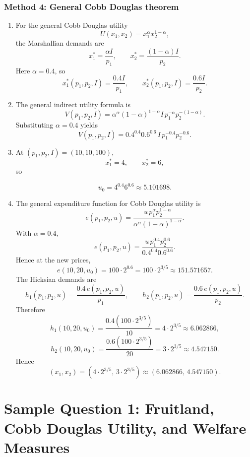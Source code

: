 \documentclass[12pt]{article}
\begin{document}
\newpage
\subsubsection{Method 4: General Cobb Douglas theorem}
\begin{enumerate}[label=(\alph*)]
    \item
    For the general Cobb Douglas utility
    \[
    U(x_1,x_2)=x_1^\alpha x_2^{1-\alpha},
    \]
    the Marshallian demands are
    \[
    x_1^*=\frac{\alpha I}{p_1},
    \qquad
    x_2^*=\frac{(1-\alpha)I}{p_2}.
    \]
    Here \(\alpha=0.4\), so
    \[
    \boxed{
    x_1^*(p_1,p_2,I)=\frac{0.4I}{p_1},
    \qquad
    x_2^*(p_1,p_2,I)=\frac{0.6I}{p_2}.
    }
    \]

    \item
    The general indirect utility formula is
    \[
    V(p_1,p_2,I)=\alpha^\alpha(1-\alpha)^{1-\alpha}I\,p_1^{-\alpha}p_2^{-(1-\alpha)}.
    \]
    Substituting \(\alpha=0.4\) yields
    \[
    \boxed{
    V(p_1,p_2,I)=0.4^{0.4}0.6^{0.6}\,I\,p_1^{-0.4}p_2^{-0.6}.
    }
    \]

    \item
    At \((p_1,p_2,I)=(10,10,100)\),
    \[
    x_1^*=4,\qquad x_2^*=6,
    \]
    so

    \[
    \boxed{u_0=4^{0.4}6^{0.6}\approx 5.101698.}
    \]

    \item
    The general expenditure function for Cobb Douglas utility is
    \[
    e(p_1,p_2,u)=\frac{u\,p_1^\alpha p_2^{1-\alpha}}{\alpha^\alpha(1-\alpha)^{1-\alpha}}.
    \]
    With \(\alpha=0.4\),
    \[
    e(p_1,p_2,u)=\frac{u\,p_1^{0.4}p_2^{0.6}}{0.4^{0.4}0.6^{0.6}}.
    \]
    Hence at the new prices,
    \[
    e(10,20,u_0)=100\cdot 2^{0.6}=100\cdot 2^{3/5}\approx 151.571657.
    \]
    The Hicksian demands are
    \[
    h_1(p_1,p_2,u)=\frac{0.4\,e(p_1,p_2,u)}{p_1},
    \qquad
    h_2(p_1,p_2,u)=\frac{0.6\,e(p_1,p_2,u)}{p_2}.
    \]
    Therefore
    \[
    h_1(10,20,u_0)=\frac{0.4(100\cdot 2^{3/5})}{10}=4\cdot 2^{3/5}\approx 6.062866,
    \]
    \[
    h_2(10,20,u_0)=\frac{0.6(100\cdot 2^{3/5})}{20}=3\cdot 2^{3/5}\approx 4.547150.
    \]
    Hence
    \[
    \boxed{\left(x_1,x_2\right)=\left(4\cdot 2^{3/5},\,3\cdot 2^{3/5}\right)\approx(6.062866,\,4.547150).}
    \]
\end{enumerate}


\newpage
\section{Sample Question 1: Fruitland, Cobb Douglas Utility, and Welfare Measures}
\end{document}
